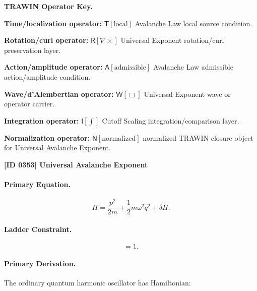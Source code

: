 \par\vspace{0.45\baselineskip}
\noindent\begin{minipage}[t]{\linewidth}
\begingroup
\small
\raggedright
\textbf{TRAWIN Operator Key.}\par
\noindent\textbf{Time/localization operator:} $\mathsf{T}\!\left[\mathrm{local}\right]$ Avalanche Law local source condition.\par
\noindent\textbf{Rotation/curl operator:} $\mathsf{R}\!\left[\nabla\times\right]$ Universal Exponent rotation/curl preservation layer.\par
\noindent\textbf{Action/amplitude operator:} $\mathsf{A}\!\left[\mathrm{admissible}\right]$ Avalanche Law admissible action/amplitude condition.\par
\noindent\textbf{Wave/d'Alembertian operator:} $\mathsf{W}\!\left[\Box\right]$ Universal Exponent wave or operator carrier.\par
\noindent\textbf{Integration operator:} $\mathsf{I}\!\left[\int\right]$ Cutoff Scaling integration/comparison layer.\par
\noindent\textbf{Normalization operator:} $\mathsf{N}\!\left[\mathrm{normalized}\right]$ normalized TRAWIN closure object for Universal Avalanche Exponent.\par
\endgroup
\end{minipage}

\clearpage
\noindent\textbf{[ID 0353] Universal Avalanche Exponent}\par
\vspace{0.35em}
\paragraph{Primary Equation.}
\begin{equation}
H
=
\frac{p^2}{2m}
+
\frac{1}{2}m\omega^2 q^2
+
\delta H .
\end{equation}

\paragraph{Ladder Constraint.}
\begin{equation}
[a,a^\dagger]=1 .
\end{equation}

\paragraph{Primary Derivation.}
The ordinary quantum harmonic oscillator has Hamiltonian:


